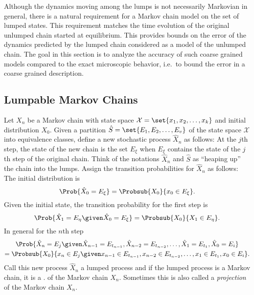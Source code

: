 \documentclass[12pt]{article}
\begin{document}
Although the dynamics moving among the lumps is not necessarily
Markovian in general, there is a natural requirement for a Markov chain model
on the set of lumped states.  This requirement matches the time evolution of
the original unlumped chain started at equilibrium.  This provides
bounds on the error of the dynamics predicted by the lumped chain
considered as a model of the unlumped chain.  The goal in this section
is to analyze the accuracy of such coarse grained models compared to the
exact microscopic behavior, i.e.\ to bound the error in a coarse grained
description.

\subsection*{Lumpable Markov Chains}


\begin{definition}
    Let \( X_n \) be a Markov chain with state space \( \mathcal{X} =
    \set{x_1, x_2, \dots, x_k} \) and initial distribution \( X_0 \).
    Given a partition \( \hat{S} = \set{E_1, E_2, \dots, E_v} \) of the
    state space \( \mathcal{X} \) into equivalence classes, define a new
    stochastic process \( \hat{X}_n \) as follows:  At the \( j \)th
    step, the state of the new chain is the set \( E_{\xi} \) when \( E_
    {\xi} \) contains the state of the \( j \)th step of the original
    chain.  Think of the notations \( \hat{X}_n \) and \( \hat{S} \) as
    ``heaping up'' the chain into the lumps.  Assign the transition
    probabilities for \( \hat{X}_n \) as follows:  The initial
    distribution is
    \[
        \Prob{\hat{X}_0 = E_{\xi}} = \Probsub{X_0}{x_0 \in E_{\xi}}.
    \] Given the initial state, the transition probability for the first
    step is
    \[
        \Prob{\hat{X}_1 = E_{\eta} \given \hat{X}_0 = E_{\xi}} =
        \Probsub{X_0}{X_1 \in E_{\eta} }.
    \] In general for the \( n \)th step
    \begin{multline*}
        \Prob{\hat{X}_n = E_j \given \hat{X}_{n-1} = E_{t_{n-1}}, \hat{X}_
        {n-2} = E_{t_{n-2}}, \dots, \hat{X}_1 = E_{t_1}, \hat{X}_0 = E_i}\\
        = \Probsub{X_0}{x_n \in E_j \given x_{n-1} \in E_{t_{n-1}}, x_{n-2}
        \in E_{t_{n-2}}, \dots, x_1 \in E_{t_1}, x_0 \in E_i}.
    \end{multline*}
    Call this new process \( \hat{X}_n \) a lumped process and if the
    lumped process is a Markov chain, it is a .%
    of the Markov chain \( X_n \).  Sometimes this is also called a
    \emph{projection} of the Markov chain \( X_n \).%
\end{definition}
\end{document}
